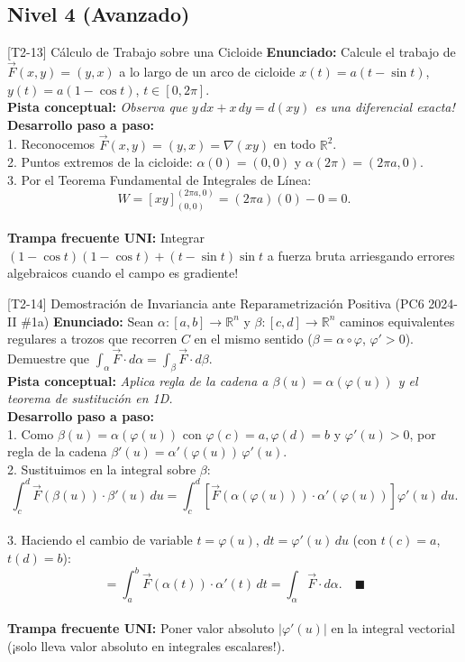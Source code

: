\documentclass[11pt,a4paper]{article}
\begin{document}
\subsection{Nivel 4 (Avanzado)}

\begin{ejerciciobox}{[T2-13] Cálculo de Trabajo sobre una Cicloide}
\textbf{Enunciado:} Calcule el trabajo de $\vec{F}(x,y) = (y, x)$ a lo largo de un arco de cicloide $x(t) = a(t - \sin t)$, $y(t) = a(1 - \cos t)$, $t \in [0, 2\pi]$.\\[0.2cm]
\textbf{Pista conceptual:} \emph{Observa que $y\,dx + x\,dy = d(xy)$ es una diferencial exacta!}\\[0.2cm]
\textbf{Desarrollo paso a paso:}\\
1. Reconocemos $\vec{F}(x,y) = (y,x) = \nabla(xy)$ en todo $\mathbb{R}^2$.\\
2. Puntos extremos de la cicloide: $\alpha(0) = (0, 0)$ y $\alpha(2\pi) = (2\pi a, 0)$.\\
3. Por el Teorema Fundamental de Integrales de Línea:\\
$$W = [xy]_{(0,0)}^{(2\pi a, 0)} = (2\pi a)(0) - 0 = 0.$$\\[0.2cm]
\textbf{Trampa frecuente UNI:} Integrar $(1-\cos t)(1-\cos t) + (t-\sin t)\sin t$ a fuerza bruta arriesgando errores algebraicos cuando el campo es gradiente!
\end{ejerciciobox}

\begin{ejerciciobox}{[T2-14] Demostración de Invariancia ante Reparametrización Positiva (PC6 2024-II \#1a)}
\textbf{Enunciado:} Sean $\alpha:[a,b]\to\mathbb{R}^n$ y $\beta:[c,d]\to\mathbb{R}^n$ caminos equivalentes regulares a trozos que recorren $C$ en el mismo sentido ($\beta = \alpha \circ \varphi$, $\varphi' > 0$). Demuestre que $\int_\alpha \vec{F}\cdot d\alpha = \int_\beta \vec{F}\cdot d\beta$.\\[0.2cm]
\textbf{Pista conceptual:} \emph{Aplica regla de la cadena a $\beta(u) = \alpha(\varphi(u))$ y el teorema de sustitución en 1D.}\\[0.2cm]
\textbf{Desarrollo paso a paso:}\\
1. Como $\beta(u) = \alpha(\varphi(u))$ con $\varphi(c)=a, \varphi(d)=b$ y $\varphi'(u) > 0$, por regla de la cadena $\beta'(u) = \alpha'(\varphi(u))\,\varphi'(u)$.\\
2. Sustituimos en la integral sobre $\beta$:\\
$$\int_c^d \vec{F}(\beta(u))\cdot\beta'(u)\,du = \int_c^d \left[\vec{F}(\alpha(\varphi(u)))\cdot\alpha'(\varphi(u))\right]\varphi'(u)\,du.$$\\
3. Haciendo el cambio de variable $t = \varphi(u)$, $dt = \varphi'(u)\,du$ (con $t(c)=a$, $t(d)=b$):\\
$$= \int_a^b \vec{F}(\alpha(t))\cdot\alpha'(t)\,dt = \int_\alpha \vec{F}\cdot d\alpha. \quad \blacksquare$$\\[0.2cm]
\textbf{Trampa frecuente UNI:} Poner valor absoluto $|\varphi'(u)|$ en la integral vectorial (¡solo lleva valor absoluto en integrales escalares!).
\end{ejerciciobox}
\end{document}
